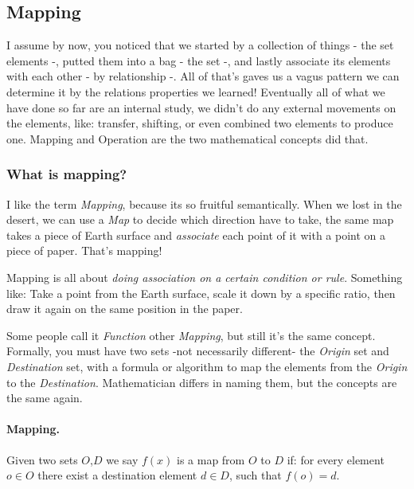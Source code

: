 
\subsection{Mapping}
I assume by now, you noticed that we started by a collection of things - the set elements -, putted them into a bag - the set -, and lastly associate its elements with each other - by relationship -. All of that's gaves us a vagus pattern we can determine it by the relations properties we learned! 
Eventually all of what we have done so far are an internal study, we didn't do any external movements on the elements, like: transfer, shifting, or even combined two elements to produce one. Mapping and Operation are the two mathematical concepts did that.

\subsubsection{What is mapping?}
I like the term {\it Mapping}, because its so fruitful semantically. When we lost in the desert, we can use a {\it Map} to decide which direction have to take, the same map takes a piece of Earth surface and {\it associate} each point of it with a point on a piece of paper. That's mapping!

Mapping is all about {\it doing association on a certain condition or rule}. Something like: Take a point from the Earth surface, scale it down by a specific ratio, then draw it again on the same position in the paper.

Some people call it {\it Function} other {\it Mapping}, but still it's the same concept. Formally, you must have two sets -not necessarily different- the {\it Origin} set and {\it Destination} set, with a formula or algorithm to map the elements from the {\it Origin} to the {\it Destination}. Mathematician differs in naming them, but the concepts are the same again.

\paragraph{Mapping.} 
Given two sets $O$,$D$ we say $f(x)$ is a map from $O$ to $D$ if: 
    for every element $o \in O$ there exist a destination element $d \in D$, such that $f(o)=d$.

